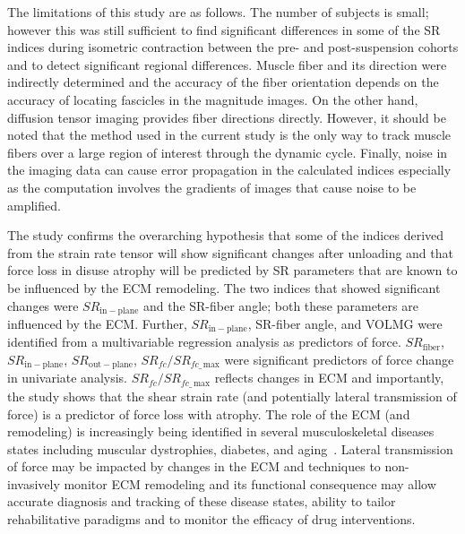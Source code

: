 The limitations of this study are as follows. 
The number of subjects is small; however this was still sufficient to find significant differences in some of the SR indices during isometric contraction between the pre- and post-suspension cohorts and to detect significant regional differences. 
Muscle fiber and its direction were indirectly determined and the accuracy of the fiber orientation depends on the accuracy of locating fascicles in the magnitude images. 
On the other hand, diffusion tensor imaging provides fiber directions directly. 
However, it should be noted that the method used in the current study is the only way to track muscle fibers over a large region of interest through the dynamic cycle. 
Finally, noise in the imaging data can cause error propagation in the calculated indices especially as the computation involves the gradients of images that cause noise to be amplified.

The study confirms the overarching hypothesis that some of the indices derived from the strain rate tensor will show significant changes after unloading and that force loss in disuse atrophy will be predicted by SR parameters that are known to be influenced by the ECM remodeling. 
The two indices that showed significant changes were $SR_{\mathrm{in-plane}}$ and the SR-fiber angle; both these parameters are influenced by the ECM. Further, $SR_{\mathrm{in-plane}}$, SR-fiber angle, and VOLMG were identified from a multivariable regression analysis as predictors of force. $SR_{\mathrm{fiber}}$, $SR_{\mathrm{in-plane}}$, $SR_{\mathrm{out-plane}}$, $SR_{fc}/SR_{fc\_\,\mathrm{max}}$ were significant predictors of force change in univariate analysis.
$SR_{fc}/SR_{fc\_\,\mathrm{max}}$ reflects changes in ECM and importantly, the study shows that the shear strain rate (and potentially lateral transmission of force) is a predictor of force loss with atrophy.
The role of the ECM (and remodeling) is increasingly being identified in several musculoskeletal diseases states including muscular dystrophies, diabetes, and aging~\cite{RNS40}.
Lateral transmission of force may be impacted by changes in the ECM and techniques to non-invasively monitor ECM remodeling and its functional consequence may allow accurate diagnosis and tracking of these disease states, ability to tailor rehabilitative paradigms and to monitor the efficacy of drug interventions.

